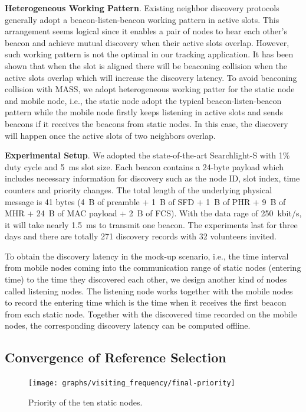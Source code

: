 \documentclass[twoside,twocolumn]{article}
\begin{document}
{\bf Heterogeneous Working Pattern}. Existing neighbor discovery protocols generally 
adopt a beacon-listen-beacon working pattern in active slots. This arrangement seems 
logical since it enables a pair of nodes to hear each other's beacon and achieve 
mutual discovery when their active slots overlap. However, such working pattern is
not the optimal in our tracking application. It has been shown that when the slot
is aligned there will be beaconing collision when the active slots overlap which will
increase the discovery latency. To avoid beaconing collision with MASS, we adopt 
heterogeneous working patter for the static node and mobile node, i.e., the static 
node adopt the typical beacon-listen-beacon pattern while the mobile node firstly keeps 
listening in active slots and sends beacons if it receives the beacons from static nodes.
In this case, the discovery will happen once the active slots of two neighbors overlap.

{\bf Experimental Setup}. We adopted the state-of-the-art Searchlight-S with 1\% duty 
cycle and 5~ms slot size. Each beacon contains a 24-byte payload which includes 
necessary information for discovery such as the node ID, slot index, time counters and
priority changes. The total length of the underlying physical message is 41 bytes (4~B 
of preamble + 1~B of SFD + 1~B of PHR + 9~B of MHR + 24~B of MAC payload + 2~B of FCS).
With the data rage of 250~kbit/s, it will take nearly 1.5~ms to transmit one beacon.
The experiments last for three days and there are totally 271 discovery records with 
32 volunteers invited.

To obtain the discovery latency in the mock-up scenario, i.e., the time interval from
mobile nodes coming into the communication range of static nodes (entering time) to the
time they discovered each other, we design another kind of nodes called listening nodes.
The listening node works together with the mobile nodes to record the entering time which
is the time when it receives the first beacon from each static node. Together with the
discovered time recorded on the mobile nodes, the corresponding discovery latency can be
computed offline.

\subsection{Convergence of Reference Selection}
\begin{figure}[t]
   \centering
   \texttt{[image: graphs/visiting\_frequency/final-priority]}
   \caption{Priority of the ten static nodes.}
   \label{fig:mock-priority}
\end{figure}
\end{document}

